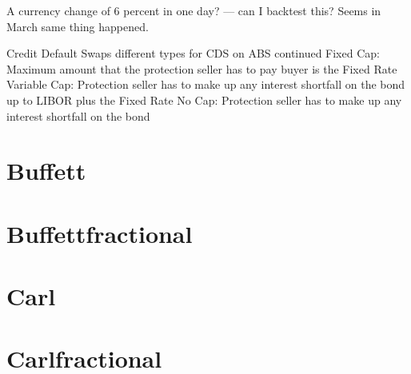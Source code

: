 \documentclass[letterpaper,10pt,english]{sphinxmanual}
\begin{document}
\begin{sphinxVerbatim}[commandchars=\\\{\}]
\end{sphinxVerbatim}

\sphinxAtStartPar
A currency change of 6 percent in one day? — can I backtest this? Seems
in March same thing happened.

\sphinxAtStartPar
Credit Default Swaps \textendash{} different types for CDS on ABS \sphinxhyphen{} continued \sphinxhyphen{}
Fixed Cap: Maximum amount that the protection seller has to pay buyer is
the Fixed Rate \sphinxhyphen{} Variable Cap: Protection seller has to make up any
interest shortfall on the bond up to LIBOR plus the Fixed Rate \sphinxhyphen{} No Cap:
Protection seller has to make up any interest shortfall on the bond

\sphinxAtStartPar
{}


\chapter{Buffett}
\label{\detokenize{Buffett2021-09-30:buffett}}\label{\detokenize{Buffett2021-09-30::doc}}
\noindent{}


\chapter{Buffettfractional}
\label{\detokenize{Buffettfractional2021-09-30:buffettfractional}}\label{\detokenize{Buffettfractional2021-09-30::doc}}
\noindent{}


\chapter{Carl}
\label{\detokenize{Carl2021-09-30:carl}}\label{\detokenize{Carl2021-09-30::doc}}
\noindent{}


\chapter{Carlfractional}
\label{\detokenize{Carlfractional2021-09-30:carlfractional}}\label{\detokenize{Carlfractional2021-09-30::doc}}
\noindent{}
\end{document}
